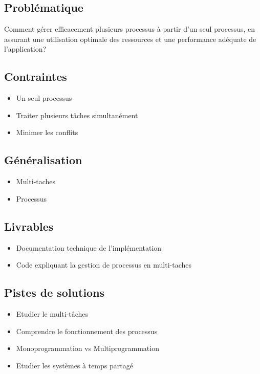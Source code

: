 \subsection*{Problématique}
{}
\noindent Comment gérer efficacement plusieurs processus à partir d'un seul processus, en assurant une utilisation optimale des ressources et une performance adéquate de l'application?

\subsection*{Contraintes}
{}
\begin{itemize}
	\item Un seul processus
	\item Traiter plusieurs tâches simultanément
	\item Minimer les conflits
\end{itemize}

\subsection*{Généralisation}
{}
\begin{itemize}
	\item Multi-taches
	\item Processus
\end{itemize}

\subsection*{Livrables}
{}
\begin{itemize}
	\item Documentation technique de l'implémentation
	\item Code expliquant la gestion de processus en multi-taches
\end{itemize}

\subsection*{Pistes de solutions}
{}
\begin{itemize}
	\item Etudier le multi-tâches
	\item Comprendre le fonctionnement des processus
	\item Monoprogrammation vs Multiprogrammation
	\item Etudier les systèmes à temps partagé
\end{itemize}

